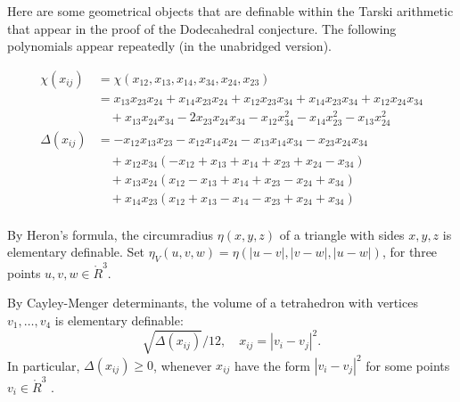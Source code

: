 Here are some geometrical 
objects that are definable within the Tarski arithmetic
that appear in the proof of the Dodecahedral conjecture.
The following  polynomials appear repeatedly (in the unabridged version).
\begin{definition}
$$
\begin{array}{lll}
 \chi(x_{ij}) &= \chi(x_{12},x_{13},x_{14},x_{34},x_{24},x_{23})\\
     &=
      x_{13} x_{23} x_{24} + x_{14} x_{23} x_{24}  + 
      x_{12} x_{23} x_{34} + x_{14} x_{23} x_{34} + x_{12} x_{24} x_{34}\\ 
      &\quad + x_{13} x_{24} x_{34} - 
      2 x_{23} x_{24} x_{34} - x_{12} x_{34}^2 
      - x_{14} x_{23}^2 - x_{13} x_{24}^2\\
[0.5ex]
\Delta(x_{ij}) &= 
   -x_{12} x_{13} x_{23} - x_{12} x_{14} x_{24} - x_{13} x_{14} x_{34} 
    - x_{23} x_{24} x_{34}\\
    &\quad + x_{12} x_{34} (-x_{12} + x_{13} + x_{14} + x_{23} + x_{24} - x_{34}) \\
  &\quad + x_{13} x_{24} (x_{12} - x_{13} + x_{14} + x_{23} - x_{24} + x_{34})\\
    &\quad + x_{14} x_{23} (x_{12} + x_{13} - x_{14} - x_{23} + x_{24} + x_{34})\\
\end{array}
    \label{def:chi}
\label{def:tar:delta}
\label{def:ups}
$$
\end{definition}

By Heron's formula, the circumradius $\eta(x,y,z)$ of a triangle with sides $x,y,z$ is elementary definable.
Set $\eta_V(u,v,w) = \eta(|u-v|,|v-w|,|u-w|)$, for three points
$u,v,w\in\ring{R}^3$.

By Cayley-Menger determinants, the volume  of a tetrahedron with vertices $v_1,\ldots,v_4$ is elementary definable:
   $$
   \sqrt{\Delta(x_{ij})}/12,\quad x_{ij}=|v_i-v_j|^2.
   $$
In particular, $\Delta(x_{ij})\ge0$, whenever $x_{ij}$ have
the form $|v_i-v_j|^2$ for some points $v_i\in\ring{R}^3$
\cite[Lemma~8.1.4]{Part1}.

